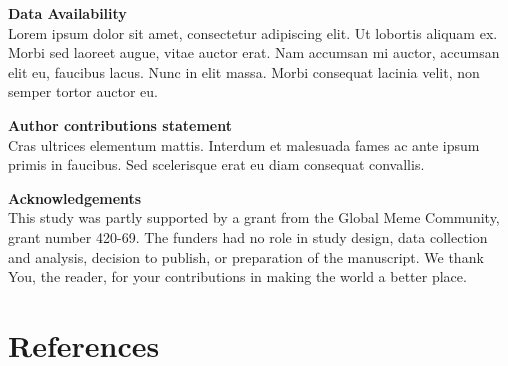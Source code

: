\begin{refsection}
\begin{footnotesize}
\noindent\textbf{Data Availability}\\
\noindent Lorem ipsum dolor sit amet, consectetur adipiscing elit. Ut lobortis aliquam ex. Morbi sed laoreet augue, vitae auctor erat. Nam accumsan mi auctor, accumsan elit eu, faucibus lacus. Nunc in elit massa. Morbi consequat lacinia velit, non semper tortor auctor eu.

\noindent\textbf{Author contributions statement}\\
\noindent Cras ultrices elementum mattis. Interdum et malesuada fames ac ante ipsum primis in faucibus. Sed scelerisque erat eu diam consequat convallis. 

\noindent\textbf{Acknowledgements}\\
\noindent This study was partly supported by a grant from the Global Meme Community, grant number 420-69.  The funders had no role in study design, data collection and analysis, decision to publish, or preparation of the manuscript. We thank You, the reader, for your contributions in making the world a better place. 

\end{footnotesize}


\newpage
\section{References}
\RemoveLabels

\vspace{0.5em}

\printbibliography[heading=none]

\end{refsection}